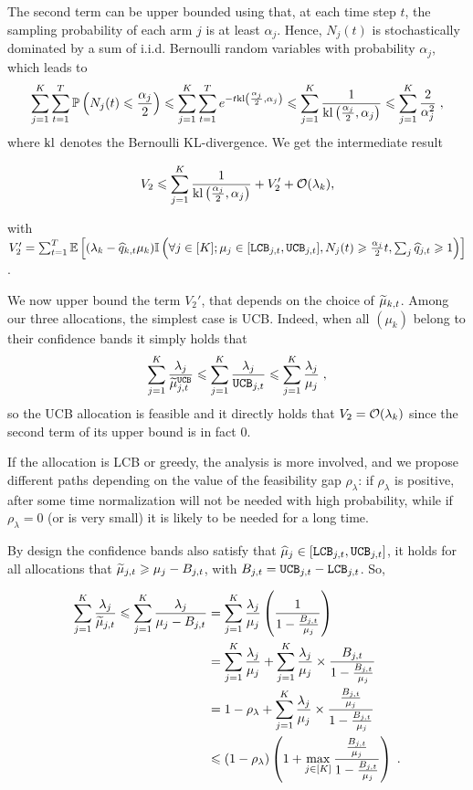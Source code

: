 The second term can be upper bounded using that, at each time step $t$, the sampling probability of each arm $j$ is at least $\alpha_j$. Hence, $N_j(t)$ is stochastically dominated by a sum of i.i.d. Bernoulli random variables with probability $\alpha_j$, which leads to 
\begin{align*}
\sum_{j=1}^K \sum_{t=1}^T\mathbb{P}\left(N_j(t)\leqslant \frac{\alpha_j}{2}\right) \leqslant \sum_{j=1}^K \sum_{t=1}^T e^{-t \text{\normalfont kl}\left(\frac{\alpha_j}{2}, \alpha_j\right)} \leqslant  \sum_{j=1}^K   \frac{1}{\text{\normalfont kl}\left(\frac{\alpha_j}{2}, \alpha_j\right)} \leqslant \sum_{j=1}^K\frac{2}{\alpha_j^2}\;,
\end{align*}
where $\text{\normalfont kl}$ denotes the Bernoulli KL-divergence. We get the intermediate result 

\[V_2 \leqslant \sum_{j=1}^K   \frac{1}{\text{\normalfont kl}\left(\frac{\alpha_j}{2}, \alpha_j\right)} + V_2'+ \mathcal{O}(\lambda_k),  \]

with $V_2'=\sum_{t=1}^T \mathbb{E}\left[(\lambda_k - \widehat{q}_{k,t}\mu_k)\mathbb{I}\left(\forall j \in [K]; \mu_j \in [\texttt{LCB}_{j, t}, \texttt{UCB}_{j, t}], N_j(t)\geqslant \frac{\alpha_j}{2}t, \sum_j \widehat{q}_{j,t} \geqslant 1\right)\right]$.

We now upper bound the term $V_2'$, that depends on the choice of $\widetilde{\mu}_{k,t}$. Among our three allocations, the simplest case is UCB. Indeed, when all $(\mu_k)$ belong to their confidence bands it simply holds that  \[\sum_{j=1}^K \frac{\lambda_j}{\widetilde{\mu}_{j,t}^{\texttt{UCB}}} \leqslant \sum_{j=1}^K \frac{\lambda_j}{ \texttt{UCB}_{j,t}} \leqslant \sum_{j=1}^K \frac{\lambda_j}{ \mu_j}\;,\] so the UCB allocation is feasible and it directly holds that $V_2=\mathcal{O}(\lambda_k)$ since the second term of its upper bound is in fact $0$.

If the allocation is LCB or greedy, the analysis is more involved, and we propose different paths depending  on the value of the feasibility gap $\rho_\lambda$: if $\rho_\lambda$ is positive, after some time normalization will not be needed with high probability, while if $\rho_\lambda=0$ (or is very small) it is likely to be needed for a long time.

By design the confidence bands also satisfy that $\widehat{\mu}_j \in [\texttt{LCB}_{j, t}, \texttt{UCB}_{j, t}]$, it holds for all allocations that $\widetilde{\mu}_{j, t}\geqslant \mu_j- B_{j, t}$, with $B_{j,t} = \texttt{UCB}_{j, t} - \texttt{LCB}_{j, t}$. So, 

\begin{align*}
\sum_{j=1}^K \frac{\lambda_j}{\widetilde{\mu}_{j, t}} \leqslant \sum_{j=1}^K \frac{\lambda_j}{\mu_j - B_{j, t}} &= \sum_{j=1}^K \frac{\lambda_j}{\mu_j}\left(\frac{1}{1-\frac{B_{j, t}}{\mu_j}}\right) \\ &= \sum_{j=1}^K \frac{\lambda_j}{\mu_j} + \sum_{j=1}^K \frac{\lambda_j}{\mu_j}\times \frac{B_{j, t}}{1 - \frac{B_{j, t}}{\mu_j}} \\
& = 1-\rho_\lambda +\sum_{j=1}^K \frac{\lambda_j}{\mu_j}\times \frac{\frac{B_{j, t}}{\mu_j}}{1 - \frac{B_{j, t}}{\mu_j}}   \\
& \leqslant (1-\rho_\lambda)\left(1+ \max_{j\in[K]}\frac{\frac{B_{j, t}}{\mu_j}}{1 - \frac{B_{j, t}}{\mu_j}} \right) \;.  \\
\end{align*}

